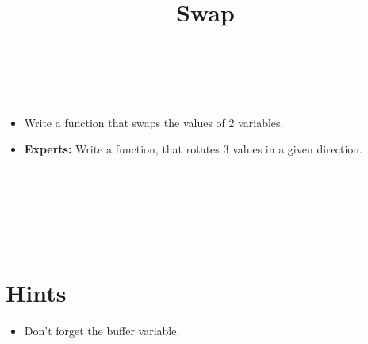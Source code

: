 

\title{Swap} %
\author{} %
\renewcommand{\difficulty}{Medium} %
\renewcommand{\requirements}{Pointers} %
\renewcommand{\aims}{Pointer stuff} %


 \maketitle
 \taskinfos

\ \\\ \\

\begin{itemize}
	\item Write a function that swaps the values of 2 variables.
	\item \textbf{Experts:} Write a function, that rotates 3 values in a given direction.
\end{itemize}	
 
 
\ \\\ \\\ \\\ \\\ \\
\section*{Hints}
	\begin{itemize}
		\item Don't forget the buffer variable.
	\end{itemize}
 

